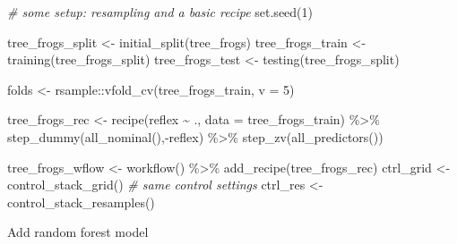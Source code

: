 \documentclass[
]{book}
\newenvironment{Shaded}{\begin{snugshade}}{\end{snugshade}}
\newcommand{\AttributeTok}[1]{\textcolor[rgb]{0.77,0.63,0.00}{#1}}
\newcommand{\CommentTok}[1]{\textcolor[rgb]{0.56,0.35,0.01}{\textit{#1}}}
\newcommand{\DecValTok}[1]{\textcolor[rgb]{0.00,0.00,0.81}{#1}}
\newcommand{\FunctionTok}[1]{\textcolor[rgb]{0.00,0.00,0.00}{#1}}
\newcommand{\NormalTok}[1]{#1}
\newcommand{\OtherTok}[1]{\textcolor[rgb]{0.56,0.35,0.01}{#1}}
\newcommand{\SpecialCharTok}[1]{\textcolor[rgb]{0.00,0.00,0.00}{#1}}
\begin{document}
\begin{Shaded}
\begin{Highlighting}[]
\CommentTok{\# some setup: resampling and a basic recipe}
\FunctionTok{set.seed}\NormalTok{(}\DecValTok{1}\NormalTok{)}

\NormalTok{tree\_frogs\_split }\OtherTok{\textless{}{-}} \FunctionTok{initial\_split}\NormalTok{(tree\_frogs)}
\NormalTok{tree\_frogs\_train }\OtherTok{\textless{}{-}} \FunctionTok{training}\NormalTok{(tree\_frogs\_split)}
\NormalTok{tree\_frogs\_test  }\OtherTok{\textless{}{-}} \FunctionTok{testing}\NormalTok{(tree\_frogs\_split)}

\NormalTok{folds }\OtherTok{\textless{}{-}}\NormalTok{ rsample}\SpecialCharTok{::}\FunctionTok{vfold\_cv}\NormalTok{(tree\_frogs\_train, }\AttributeTok{v =} \DecValTok{5}\NormalTok{)}

\NormalTok{tree\_frogs\_rec }\OtherTok{\textless{}{-}}
    \FunctionTok{recipe}\NormalTok{(reflex }\SpecialCharTok{\textasciitilde{}}\NormalTok{ ., }\AttributeTok{data =}\NormalTok{ tree\_frogs\_train) }\SpecialCharTok{\%\textgreater{}\%}
    \FunctionTok{step\_dummy}\NormalTok{(}\FunctionTok{all\_nominal}\NormalTok{(),}\SpecialCharTok{{-}}\NormalTok{reflex) }\SpecialCharTok{\%\textgreater{}\%}
    \FunctionTok{step\_zv}\NormalTok{(}\FunctionTok{all\_predictors}\NormalTok{())}

\NormalTok{tree\_frogs\_wflow }\OtherTok{\textless{}{-}}
    \FunctionTok{workflow}\NormalTok{() }\SpecialCharTok{\%\textgreater{}\%}
    \FunctionTok{add\_recipe}\NormalTok{(tree\_frogs\_rec)}
\NormalTok{ctrl\_grid }\OtherTok{\textless{}{-}} \FunctionTok{control\_stack\_grid}\NormalTok{() }\CommentTok{\# same control settings}
\NormalTok{ctrl\_res }\OtherTok{\textless{}{-}} \FunctionTok{control\_stack\_resamples}\NormalTok{()}
\end{Highlighting}
\end{Shaded}

Add random forest model
\end{document}
